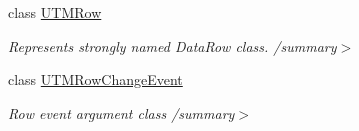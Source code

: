 \begin{DoxyCompactItemize}
class \hyperlink{class_env_int_1_1_win32_1_1_field_tech_1_1_manager_1_1_data_sets_1_1_guide_ware_mobile_data_set_1_1_u_t_m_row}{U\+T\+M\+Row}
\begin{DoxyCompactList}\small\item\em Represents strongly named Data\+Row class. /summary$>$ \end{DoxyCompactList}\item 
class \hyperlink{class_env_int_1_1_win32_1_1_field_tech_1_1_manager_1_1_data_sets_1_1_guide_ware_mobile_data_set_1_1_u_t_m_row_change_event}{U\+T\+M\+Row\+Change\+Event}
\begin{DoxyCompactList}\small\item\em Row event argument class /summary$>$ \end{DoxyCompactList}\end{DoxyCompactItemize}
